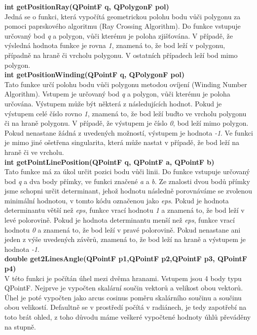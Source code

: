 \documentclass[a4paper, 12pt]{article}
\begin{document}
\textbf{int getPositionRay(QPointF q, QPolygonF pol)}\\
Jedná se o funkci, která vypočítá geometrickou polohu bodu vůči polygonu za pomoci paprskového algoritmu (Ray Crossing Algorithm). Do funkce vstupuje určovaný bod \textit{q} a polygon, vůči kterému je poloha zjišťována. V případě, že výsledná hodnota funkce je rovna \textit{1}, znamená to, že bod leží v polygonu, případně na hraně či vrcholu polygonu. V ostatních případech leží bod mimo polygon.\\

\textbf{int getPositionWinding(QPointF q, QPolygonF pol)}\\
Tato funkce určí polohu bodu vůči polygonu metodou ovíjení (Winding Number Algorithm). Vstupem je určovaný bod \textit{q} a polygon, vůči kterému je poloha určována. Výstupem může být některá z následujících hodnot. Pokud je výstupem celé číslo rovno \textit{1}, znamená to, že bod leží buďto ve vrcholu polygonu či na hraně polygonu. V případě, že výstupem je číslo \textit{0}, bod leží mimo polygon. Pokud nenastane žádná z uvedených možností, výstupem je hodnota \textit{-1}. Ve funkci je mimo jiné ošetřena singularita, která může nastat v případě, že bod leží na hraně či ve vrcholu.\\

\textbf{int getPointLinePosition(QPointF q, QPointF a, QPointF b)}\\
Tato funkce má za úkol určit pozici bodu vůči linii. Do funkce vstupuje určovaný bod \textit{q} a dva body přímky, ve funkci značené \textit{a} a \textit{b}. Ze znalosti dvou bodů přímky jsme schopni určit determinant, jehož hodnotu následně porovnáváme se zvolenou minimální hodnotou, v tomto kódu označenou jako \textit{eps}. Pokud je hodnota determinantu větší než \textit{eps}, funkce vrací hodnotu \textit{1} a znamená to, že bod leží v levé polorovině. Pokud je hodnota determinantu menší než \textit{eps}, funkce vrací hodnotu \textit{0} a znamená to, že bod leží v pravé polorovině. Pokud nenastane ani jeden z výše uvedených závěrů, znamená to, že bod leží na hraně a výstupem je hodnota \textit{-1}.\\

\textbf{double get2LinesAngle(QPointF p1,QPointF p2,QPointF p3, QPointF p4)}\\
V této funkci je počítán úhel mezi dvěma hranami. Vstupem jsou 4 body typu QPointF. Nejprve je vypočten skalární součin vektorů a velikost obou vektorů. Úhel je poté vypočten jako arcus cosinus poměru skalárního součinu a součinu obou velikostí. Defaultně se v prostředí počítá v radiánech, je tedy zapotřebí na toto brát ohled, z toho důvodu máme veškeré vypočtené hodnoty úhlů převáděny na stupně. \\
\end{document}
